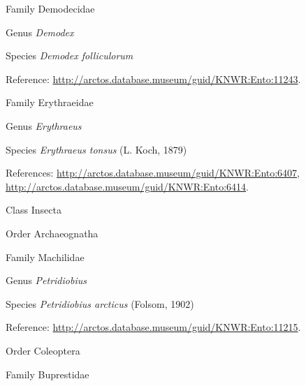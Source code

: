 \documentclass[9pt, article]{memoir}
\begin{document}
\begin{multicols}{2}
\vspace{6pt}\noindent\hspace{24pt}Family Demodecidae


\vspace{6pt}\noindent\hspace{30pt}Genus \textit{Demodex}


\vspace{6pt}\noindent\hspace{36pt}Species \textit{Demodex folliculorum}


Reference: 
\url{http://arctos.database.museum/guid/KNWR:Ento:11243}.

\vspace{6pt}\noindent\hspace{24pt}Family Erythraeidae


\vspace{6pt}\noindent\hspace{30pt}Genus \textit{Erythraeus}


\vspace{6pt}\noindent\hspace{36pt}Species \textit{Erythraeus tonsus} (L. Koch, 1879)


References: 
\url{http://arctos.database.museum/guid/KNWR:Ento:6407}, 
\url{http://arctos.database.museum/guid/KNWR:Ento:6414}.

\vspace{6pt}\noindent\hspace{12pt}Class Insecta


\vspace{6pt}\noindent\hspace{18pt}Order Archaeognatha


\vspace{6pt}\noindent\hspace{24pt}Family Machilidae


\vspace{6pt}\noindent\hspace{30pt}Genus \textit{Petridiobius}


\vspace{6pt}\noindent\hspace{36pt}Species \textit{Petridiobius arcticus} (Folsom, 1902)


Reference: 
\url{http://arctos.database.museum/guid/KNWR:Ento:11215}.

\vspace{6pt}\noindent\hspace{18pt}Order Coleoptera


\vspace{6pt}\noindent\hspace{24pt}Family Buprestidae



\end{multicols}
\end{document}

